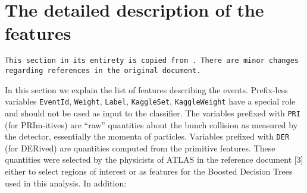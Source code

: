 \section{The detailed description of the features}\label{app:data}

\texttt{This section in its entirety is copied from \cite{higgsPaper}. There are minor changes regarding references in the original document.}

In this section we explain the list of features describing the events.
Prefix-less variables \texttt{EventId}, \texttt{Weight}, \texttt{Label}, \texttt{KaggleSet}, \texttt{KaggleWeight} have a special role and should not be used as input to the classifier. The variables prefixed with \texttt{PRI} (for PRIm-itives) are “raw” quantities about the bunch collision as measured by the detector, essentially the momenta of particles. Variables prefixed with \texttt{DER} (for DERived) are quantities computed from the primitive features. These quantities were selected by the physicists of ATLAS in the reference document [3] either to select regions of interest or as features for the Boosted Decision Trees used in this analysis. In addition:

%
\pagebreak

	{\pagebreak \thispagestyle{empty} \cleardoublepage}{\clearpage}
